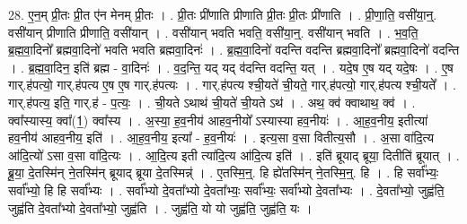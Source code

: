 \documentclass[17pt]{extarticle}
\begin{document}
28. ए॒न॒म् प्री॒तः प्री॒त ए॑न मेनम् प्री॒तः । . प्री॒तः प्री॑णाति प्रीणाति प्री॒तः प्री॒तः प्री॑णाति । . प्री॒णा॒ति॒ वसी॑या॒न्॒. वसी॑यान् प्रीणाति प्रीणाति॒ वसी॑यान् । . वसी॑यान् भवति भवति॒ वसी॑या॒न्॒. वसी॑यान् भवति । . भ॒व॒ति॒ ब्र॒ह्म॒वा॒दिनो᳚ ब्रह्मवा॒दिनो॑ भवति भवति ब्रह्मवा॒दिनः॑ । . ब्र॒ह्म॒वा॒दिनो॑ वदन्ति वदन्ति ब्रह्मवा॒दिनो᳚ ब्रह्मवा॒दिनो॑ वदन्ति । . ब्र॒ह्म॒वा॒दिन॒ इति॑ ब्रह्म - वा॒दिनः॑ । . व॒द॒न्ति॒ यद् यद् व॑दन्ति वदन्ति॒ यत् । . यदे॒ष ए॒ष यद् यदे॒षः । . ए॒ष गार्.ह॑पत्यो॒ गार्.ह॑पत्य ए॒ष ए॒ष गार्.ह॑पत्यः । . गार्.ह॑पत्य श्ची॒यते॑ ची॒यते॒ गार्.ह॑पत्यो॒ गार्.ह॑पत्य श्ची॒यते᳚ । . गार्.ह॑पत्य॒ इति॒ गार्.ह॑ - प॒त्यः॒ । . ची॒यते ऽथाथ॑ ची॒यते॑ ची॒यते ऽथ॑ । . अथ॒ क्व॑ क्वाथाथ॒ क्व॑ । . क्वा᳚स्यास्य॒ क्वा᳚(1॒) क्वा᳚स्य । . अ॒स्या॒ ह॒व॒नीय॑ आहव॒नीयो᳚ ऽस्यास्या हव॒नीयः॑ । . आ॒ह॒व॒नीय॒ इतीत्या॑ हव॒नीय॑ आहव॒नीय॒ इति॑ । . आ॒ह॒व॒नीय॒ इत्या᳚ - ह॒व॒नीयः॑ । . इत्य॒सा व॒सा वितीत्य॒सौ । . अ॒सा वा॑दि॒त्य आ॑दि॒त्यो॑ ऽसा व॒सा वा॑दि॒त्यः । . आ॒दि॒त्य इती त्या॑दि॒त्य आ॑दि॒त्य इति॑ । . इति॑ ब्रूयाद् ब्रूया॒ दितीति॑ ब्रूयात् । . ब्रू॒या॒ दे॒तस्मि॑न् ने॒तस्मि॑न् ब्रूयाद् ब्रूया दे॒तस्मिन्न्॑ । . ए॒तस्मि॒न्॒. हि ह्ये॑तस्मि॑न् ने॒तस्मि॒न्॒. हि । . हि सर्वा᳚भ्यः॒ सर्वा᳚भ्यो॒ हि हि सर्वा᳚भ्यः । . सर्वा᳚भ्यो दे॒वता᳚भ्यो दे॒वता᳚भ्यः॒ सर्वा᳚भ्यः॒ सर्वा᳚भ्यो दे॒वता᳚भ्यः । . दे॒वता᳚भ्यो॒ जुह्व॑ति॒ जुह्व॑ति दे॒वता᳚भ्यो दे॒वता᳚भ्यो॒ जुह्व॑ति । . जुह्व॑ति॒ यो यो जुह्व॑ति॒ जुह्व॑ति॒ यः । \newline
\end{document}
